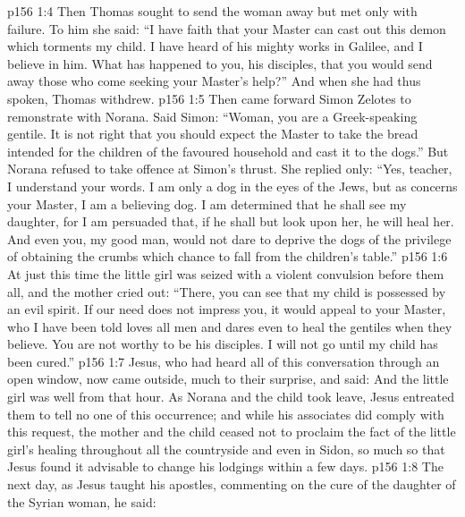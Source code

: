 \vs p156 1:4 Then Thomas sought to send the woman away but met only with failure. To him she said: “I have faith that your Master can cast out this demon which torments my child. I have heard of his mighty works in Galilee, and I believe in him. What has happened to you, his disciples, that you would send away those who come seeking your Master’s help?” And when she had thus spoken, Thomas withdrew.
\vs p156 1:5 Then came forward Simon Zelotes to remonstrate with Norana. Said Simon: “Woman, you are a Greek\hyp{}speaking gentile. It is not right that you should expect the Master to take the bread intended for the children of the favoured household and cast it to the dogs.” But Norana refused to take offence at Simon’s thrust. She replied only: “Yes, teacher, I understand your words. I am only a dog in the eyes of the Jews, but as concerns your Master, I am a believing dog. I am determined that he shall see my daughter, for I am persuaded that, if he shall but look upon her, he will heal her. And even you, my good man, would not dare to deprive the dogs of the privilege of obtaining the crumbs which chance to fall from the children’s table.”
\vs p156 1:6 At just this time the little girl was seized with a violent convulsion before them all, and the mother cried out: “There, you can see that my child is possessed by an evil spirit. If our need does not impress you, it would appeal to your Master, who I have been told loves all men and dares even to heal the gentiles when they believe. You are not worthy to be his disciples. I will not go until my child has been cured.”
\vs p156 1:7 Jesus, who had heard all of this conversation through an open window, now came outside, much to their surprise, and said:  And the little girl was well from that hour. As Norana and the child took leave, Jesus entreated them to tell no one of this occurrence; and while his associates did comply with this request, the mother and the child ceased not to proclaim the fact of the little girl’s healing throughout all the countryside and even in Sidon, so much so that Jesus found it advisable to change his lodgings within a few days.
\vs p156 1:8 \pc The next day, as Jesus taught his apostles, commenting on the cure of the daughter of the Syrian woman, he said: 
